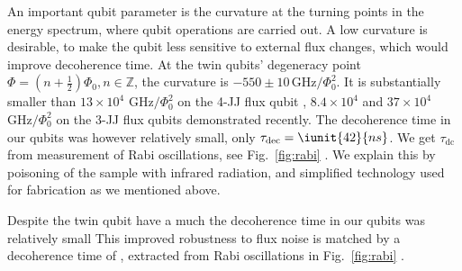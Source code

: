  An important qubit parameter  is the curvature at the turning points  in the energy spectrum,
 where qubit operations are carried out. A low  curvature is desirable, to make the qubit less
 sensitive  to external  flux changes,  which  would improve  decoherence time.   At the  twin
 qubits'  degeneracy point  $ \Phi  =  (n +  \frac{1}{2})\Phi_0,  n\in\mathbb{Z} $,  the curvature  is
 $   -550\pm10\,\text{GHz}/\Phi_0^2  $.    It  is   substantially  smaller   than  $   13\times  10^4$
 $ \text{GHz}/\Phi_0^2$ on the 4-JJ flux qubit \cite{stern2014}, $ 8.4 \times 10^4$ \cite{zhu2010} and
 $ 37\times 10^{4}$ $ \text{GHz}/\Phi_0^2$ \cite{gustavsson2012}  on the 3-JJ flux qubits demonstrated
 recently.   The  decoherence   time  in  our  qubits  was  however   relatively  small,  only
 $  \tau_\text{dec}  =  \iunit{42}{ns}  $.   We   get  $\tau_\text{dc}$  from  measurement  of  Rabi
 oscillations,  see Fig.~\ref{fig:rabi}  \cite{rabi}.  We  explain  this by  poisoning of  the
 sample  with  infrared radiation,  and  simplified  technology  used  for fabrication  as  we
 mentioned above.

 Despite the twin  qubit have a much the  decoherence time in our qubits  was relatively small
 This improved robustness to  flux noise is matched by a decoherence time  of , extracted from
 Rabi oscillations in Fig.~\ref{fig:rabi} \cite{rabi}.

